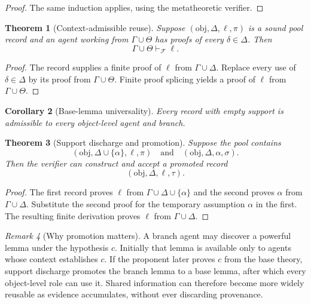 \documentclass[11pt]{article}
\newtheorem{theorem}{Theorem}[section]
\newtheorem{corollary}[theorem]{Corollary}
\theoremstyle{definition}
\theoremstyle{remark}
\newtheorem{remark}[theorem]{Remark}
\newcommand{\F}{\mathcal F}
\newcommand{\Gammaa}{\Gamma}
\begin{document}
\begin{proof}
The same induction applies, using the metatheoretic verifier.
\end{proof}

\begin{theorem}[Context-admissible reuse]
Suppose $(\mathrm{obj},\Delta,\ell,\pi)$ is a sound pool record and an agent working from $\Gammaa\cup\Theta$ has proofs of every $\delta\in\Delta$. Then
\[
\Gammaa\cup\Theta\vdash_{\F}\ell.
\]
\end{theorem}

\begin{proof}
The record supplies a finite proof of $\ell$ from $\Gammaa\cup\Delta$. Replace every use of $\delta\in\Delta$ by its proof from $\Gammaa\cup\Theta$. Finite proof splicing yields a proof of $\ell$ from $\Gammaa\cup\Theta$.
\end{proof}

\begin{corollary}[Base-lemma universality]
Every record with empty support is admissible to every object-level agent and branch.
\end{corollary}

\begin{theorem}[Support discharge and promotion]
Suppose the pool contains
\[
(\mathrm{obj},\Delta\cup\{\alpha\},\ell,\pi)
\quad\text{and}\quad
(\mathrm{obj},\Delta,\alpha,\sigma).
\]
Then the verifier can construct and accept a promoted record
\[
(\mathrm{obj},\Delta,\ell,\tau).
\]
\end{theorem}

\begin{proof}
The first record proves $\ell$ from $\Gammaa\cup\Delta\cup\{\alpha\}$ and the second proves $\alpha$ from $\Gammaa\cup\Delta$. Substitute the second proof for the temporary assumption $\alpha$ in the first. The resulting finite derivation proves $\ell$ from $\Gammaa\cup\Delta$.
\end{proof}

\begin{remark}[Why promotion matters]
A branch agent may discover a powerful lemma under the hypothesis $c$. Initially that lemma is available only to agents whose context establishes $c$. If the proponent later proves $c$ from the base theory, support discharge promotes the branch lemma to a base lemma, after which every object-level role can use it. Shared information can therefore become more widely reusable as evidence accumulates, without ever discarding provenance.
\end{remark}
\end{document}
